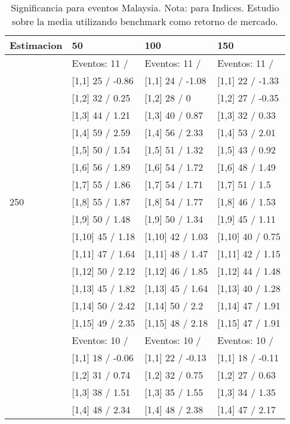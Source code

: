 \begin{table}

\caption{Significancia para eventos Malaysia. Nota: para Indices. Estudio sobre la media utilizando benchmark como retorno de mercado.}
\centering
\begin{tabular}[t]{llll}
\toprule
Estimacion & 50 & 100 & 150\\
\midrule
 & Eventos:  11 / & Eventos:  11 / & Eventos:  11 /\\
 & {}[1,1] 25  / -0.86 & {}[1,1] 24  / -1.08 & {}[1,1] 22  / -1.33\\
 & {}[1,2] 32  / 0.25 & {}[1,2] 28  / 0 & {}[1,2] 27  / -0.35\\
 & {}[1,3] 44  / 1.21 & {}[1,3] 40  / 0.87 & {}[1,3] 32  / 0.33\\
 & {}[1,4] 59  / 2.59 & {}[1,4] 56  / 2.33 & {}[1,4] 53  / 2.01\\
\addlinespace
 & {}[1,5] 50  / 1.54 & {}[1,5] 51  / 1.32 & {}[1,5] 43  / 0.92\\
 & {}[1,6] 56  / 1.89 & {}[1,6] 54  / 1.72 & {}[1,6] 48  / 1.49\\
 & {}[1,7] 55  / 1.86 & {}[1,7] 54  / 1.71 & {}[1,7] 51  / 1.5\\
250 & {}[1,8] 55  / 1.87 & {}[1,8] 54  / 1.77 & {}[1,8] 46  / 1.53\\
 & {}[1,9] 50  / 1.48 & {}[1,9] 50  / 1.34 & {}[1,9] 45  / 1.11\\
\addlinespace
 & {}[1,10] 45  / 1.18 & {}[1,10] 42  / 1.03 & {}[1,10] 40  / 0.75\\
 & {}[1,11] 47  / 1.64 & {}[1,11] 48  / 1.47 & {}[1,11] 42  / 1.15\\
 & {}[1,12] 50  / 2.12 & {}[1,12] 46  / 1.85 & {}[1,12] 44  / 1.48\\
 & {}[1,13] 45  / 1.82 & {}[1,13] 45  / 1.64 & {}[1,13] 40  / 1.28\\
 & {}[1,14] 50  / 2.42 & {}[1,14] 50  / 2.2 & {}[1,14] 47  / 1.91\\
\addlinespace
 & {}[1,15] 49  / 2.35 & {}[1,15] 48  / 2.18 & {}[1,15] 47  / 1.91\\
 & Eventos:  10 / & Eventos:  10 / & Eventos:  10 /\\
 & {}[1,1] 18  / -0.06 & {}[1,1] 22  / -0.13 & {}[1,1] 18  / -0.11\\
 & {}[1,2] 31  / 0.74 & {}[1,2] 32  / 0.75 & {}[1,2] 27  / 0.63\\
 & {}[1,3] 38  / 1.51 & {}[1,3] 35  / 1.55 & {}[1,3] 34  / 1.35\\
\addlinespace
 & {}[1,4] 48  / 2.34 & {}[1,4] 48  / 2.38 & {}[1,4] 47  / 2.17\\

\end{tabular}
\end{table}
